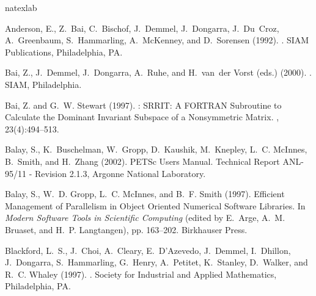 \documentclass[titlepage,10pt,a4paper]{slepc}
\begin{document}
%
%
\begin{thebibliography}{19}
\expandafter\ifx\csname natexlab\endcsname\relax\def\natexlab#1{#1}\fi

Anderson, E., Z.~Bai, C.~Bischof, J.~Demmel, J.~Dongarra, J.~Du~Croz,
  A.~Greenbaum, S.~Hammarling, A.~McKenney, and D.~Sorensen (1992).
.
\newblock SIAM Publications, Philadelphia, PA.

Bai, Z., J.~Demmel, J.~Dongarra, A.~Ruhe, and H.~van~der Vorst (eds.) (2000).
.
\newblock SIAM, Philadelphia.

Bai, Z. and G.~W. Stewart (1997).
: {SRRIT}: {A} {FORTRAN} Subroutine to Calculate the
  Dominant Invariant Subspace of a Nonsymmetric Matrix.
, 23(4):494--513.

Balay, S., K.~Buschelman, W.~Gropp, D.~Kaushik, M.~Knepley, L.~C. McInnes,
  B.~Smith, and H.~Zhang (2002).
\newblock PETSc Users Manual.
\newblock Technical Report ANL-95/11 - Revision 2.1.3, Argonne National
  Laboratory.

Balay, S., W.~D. Gropp, L.~C. McInnes, and B.~F. Smith (1997).
\newblock Efficient Management of Parallelism in Object Oriented Numerical
  Software Libraries.
\newblock In {\em Modern Software Tools in Scientific Computing\/} (edited by
  E.~Arge, A.~M. Bruaset, and H.~P. Langtangen), pp. 163--202. Birkhauser
  Press.

Blackford, L.~S., J.~Choi, A.~Cleary, E.~D'Azevedo, J.~Demmel, I.~Dhillon,
  J.~Dongarra, S.~Hammarling, G.~Henry, A.~Petitet, K.~Stanley, D.~Walker, and
  R.~C. Whaley (1997).
.
\newblock Society for Industrial and Applied Mathematics, Philadelphia, PA.


\end{thebibliography}
\end{document}
